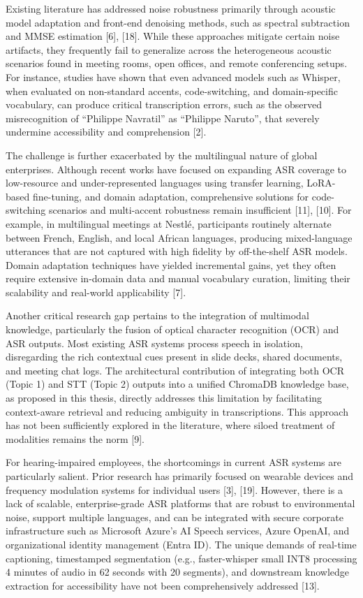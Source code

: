 \documentclass[12pt,a4paper]{article}
\begin{document}
Existing literature has addressed noise robustness primarily through acoustic model adaptation and front-end denoising methods, such as spectral subtraction and MMSE estimation [6], [18]. While these approaches mitigate certain noise artifacts, they frequently fail to generalize across the heterogeneous acoustic scenarios found in meeting rooms, open offices, and remote conferencing setups. For instance, studies have shown that even advanced models such as Whisper, when evaluated on non-standard accents, code-switching, and domain-specific vocabulary, can produce critical transcription errors, such as the observed misrecognition of “Philippe Navratil” as “Philippe Naruto”, that severely undermine accessibility and comprehension [2].


The challenge is further exacerbated by the multilingual nature of global enterprises. Although recent works have focused on expanding ASR coverage to low-resource and under-represented languages using transfer learning, LoRA-based fine-tuning, and domain adaptation, comprehensive solutions for code-switching scenarios and multi-accent robustness remain insufficient [11], [10]. For example, in multilingual meetings at Nestlé, participants routinely alternate between French, English, and local African languages, producing mixed-language utterances that are not captured with high fidelity by off-the-shelf ASR models. Domain adaptation techniques have yielded incremental gains, yet they often require extensive in-domain data and manual vocabulary curation, limiting their scalability and real-world applicability [7].


Another critical research gap pertains to the integration of multimodal knowledge, particularly the fusion of optical character recognition (OCR) and ASR outputs. Most existing ASR systems process speech in isolation, disregarding the rich contextual cues present in slide decks, shared documents, and meeting chat logs. The architectural contribution of integrating both OCR (Topic 1) and STT (Topic 2) outputs into a unified ChromaDB knowledge base, as proposed in this thesis, directly addresses this limitation by facilitating context-aware retrieval and reducing ambiguity in transcriptions. This approach has not been sufficiently explored in the literature, where siloed treatment of modalities remains the norm [9].


For hearing-impaired employees, the shortcomings in current ASR systems are particularly salient. Prior research has primarily focused on wearable devices and frequency modulation systems for individual users [3], [19]. However, there is a lack of scalable, enterprise-grade ASR platforms that are robust to environmental noise, support multiple languages, and can be integrated with secure corporate infrastructure such as Microsoft Azure’s AI Speech services, Azure OpenAI, and organizational identity management (Entra ID). The unique demands of real-time captioning, timestamped segmentation (e.g., faster-whisper small INT8 processing 4 minutes of audio in 62 seconds with 20 segments), and downstream knowledge extraction for accessibility have not been comprehensively addressed [13].
\end{document}
